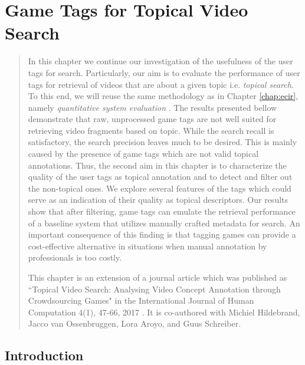 \chapter{Game Tags for Topical Video Search}\label{chap:topicir-filter}
\begin{quotation}
\noindent
In this chapter we continue our investigation of the usefulness of the user tags for search. Particularly, our aim is to evaluate the performance of user tags for retrieval of videos that are about a given topic i.e. \textit{topical search}. To this end, we will reuse the same methodology as in Chapter \ref{chap:ecir}, namely \textit{quantitative system evaluation} \cite{vorhees}. The results presented bellow demonstrate that raw, unprocessed game tags are not well suited for retrieving video fragments based on topic. While the search recall is satisfactory, the search precision leaves much to be desired. This is mainly caused by the presence of game tags which are not valid topical annotations. Thus, the second aim in this chapter is to characterize the quality of the user tags as topical annotation and to detect and filter out the non-topical ones. We explore several features of the tags which could serve as an indication of their quality as topical descriptors. Our results show that after filtering, game tags can emulate the retrieval performance of a baseline system that utilizes manually crafted metadata for search. An important consequence of this finding is that tagging games can provide a cost-effective alternative in situations when manual annotation by professionals is too costly.

This chapter is an extension of a journal article which was published as ``Topical Video Search: Analysing Video Concept Annotation through Crowdsourcing Games" in the International Journal of Human Computation 4(1), 47-66, 2017 \cite{hcj-riste}. It is co-authored with Michiel Hildebrand, Jacco van Ossenbruggen, Lora Aroyo, and Guus Schreiber.

\end{quotation}

\section{Introduction}

